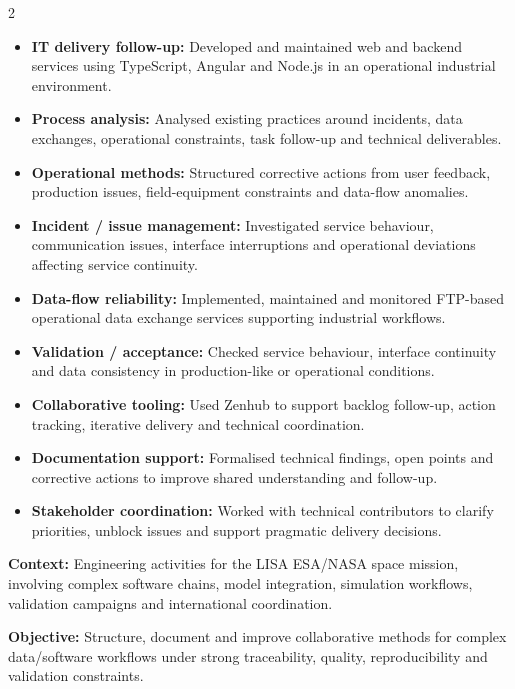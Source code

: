 \documentclass[8pt,a4paper,ragged2e,withhyper]{altacv}
\begin{document}
\begin{paracol}{2}
\begin{itemize}
  \item \textbf{IT delivery follow-up:} Developed and maintained web and backend services using TypeScript, Angular and Node.js in an operational industrial environment.
  \item \textbf{Process analysis:} Analysed existing practices around incidents, data exchanges, operational constraints, task follow-up and technical deliverables.
  \item \textbf{Operational methods:} Structured corrective actions from user feedback, production issues, field-equipment constraints and data-flow anomalies.
  \item \textbf{Incident / issue management:} Investigated service behaviour, communication issues, interface interruptions and operational deviations affecting service continuity.
  \item \textbf{Data-flow reliability:} Implemented, maintained and monitored FTP-based operational data exchange services supporting industrial workflows.
  \item \textbf{Validation / acceptance:} Checked service behaviour, interface continuity and data consistency in production-like or operational conditions.
  \item \textbf{Collaborative tooling:} Used Zenhub to support backlog follow-up, action tracking, iterative delivery and technical coordination.
  \item \textbf{Documentation support:} Formalised technical findings, open points and corrective actions to improve shared understanding and follow-up.
  \item \textbf{Stakeholder coordination:} Worked with technical contributors to clarify priorities, unblock issues and support pragmatic delivery decisions.
\end{itemize}

\divider


\textbf{Context:} Engineering activities for the LISA ESA/NASA space mission, involving complex software chains, model integration, simulation workflows, validation campaigns and international coordination.

\textbf{Objective:} Structure, document and improve collaborative methods for complex data/software workflows under strong traceability, quality, reproducibility and validation constraints.


\end{paracol}
\end{document}
